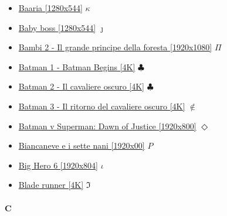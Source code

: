		\begin{itemize}
			\item \href{https://mega.nz/#!iQJjTKTC!pt_gsdA1SzkVCnH-J0Q4ocsao2gwdtMIoXYFAPXhYNQ} {Baaria [1280x544]}  $\kappa$ \\ 
			\item \href{https://mega.nz/#!mrBx1CIK!A46gnh6SsuXYupx3QaADgoTxttRSQOrt4oNaGfPQEPE} {Baby boss [1280x544]}  $\jmath$ \\ 
			\item \href{https://mega.nz/#!taRjQJZb!wkvpjBvauXcvMDUvT5_CKJu_rS_qAu8UQqhJ8y1NN0s} {Bambi 2 - Il grande principe della foresta [1920x1080]}  $\Pi$ \\ 
			\item \href{https://mega.nz/#!ijJCnTrD!E79SlY78WvKHiQvdxHrluaM-_E61kBKjtd_AXsaNXaA} {Batman 1 -  Batman Begins [4K]}  $\clubsuit$ \\ 
			\item \href{https://mega.nz/#!qzA3RZZQ!RmIvg2dkWsS8f3mhAS2AYojiaBist-xj-on1xQPPIq4} {Batman 2 - Il cavaliere oscuro [4K]}  $\clubsuit$ \\ 
			\item \href{https://mega.nz/#!O3wkUL6C!InXlspqp43Tx3oQ4B1lN_9qO8CmiAJyqUARswKLuA_Y} {Batman 3 - Il ritorno del cavaliere oscuro [4K]}  $\notin$ \\
			\item \href{https://mega.nz/#!LR4VVBab!5phL_VSZ4eXmnATIc2jITNZpBj2EI1Z5aX2wlFc4CGk} {Batman v Superman: Dawn of Justice [1920x800]}  $\Diamond$ \\
			\item \href{https://mega.nz/#!dapF1SZI!ZJPMGNC00JTcsxj03TnblVGiCHkuUFemxiImAlwdgdI} {Biancaneve e i sette nani [1920x00]}  $P$ \\ 
			\item \href{https://mega.nz/#!glABCYAJ!Mc7cTkdMMbw1Efy37XGayCw_m5mexOcvwHh9IZ-pjZo} {Big Hero 6 [1920x804]}  $\iota$ \\ 
			\item \href{https://mega.nz/#!mPoTWQrY!L_0IaTEmtJUE4PhnlGFOKEZs6I27uJKuup6hOBcmc-w} {Blade runner [4K]}  $\Im$ \\ 
			
		
		\end{itemize}	
		
	\paragraph{C} \hypertarget{FIC}{}
	
